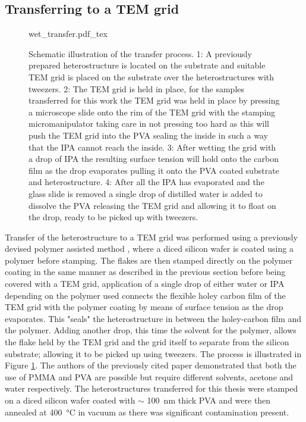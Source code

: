 \subsection{Transferring to a TEM grid}
\begin{figure}[h]
	\centering
	\def\svgwidth{1\linewidth}
	{wet_transfer.pdf_tex}
	\caption{Schematic illustration of the transfer process. 1: A previously prepared heterostructure is located on the substrate and suitable TEM grid is placed on the substrate over the heterostructures with tweezers. 2: The TEM grid is held in place, for the samples transferred for this work the TEM grid was held in place by pressing a microscope slide onto the rim of the TEM grid with the stamping micromanipulator taking care in not pressing too hard as this will push the TEM grid into the PVA sealing the inside in such a way that the IPA cannot reach the inside. 3: After wetting the grid with a drop of IPA the resulting surface tension will hold onto the carbon film as the drop evaporates pulling it onto the PVA coated substrate and heterostructure. 4: After all the IPA has evaporated and the glass slide is removed a single drop of distilled water is added to dissolve the PVA releasing the TEM grid and allowing it to float on the drop, ready to be picked up with tweezers.}
	\label{fig:wet_transfer}
\end{figure}

Transfer of the heterostructure to a TEM grid was performed using a previously devised polymer assisted method \cite{kosterPolymerassistedTEMSpecimen2021}, where a diced silicon wafer is coated using a polymer before stamping.
The flakes are then stamped directly on the polymer coating in the same manner as described in the previous section before being covered with a TEM grid, application of a single drop of either water or IPA  depending on the polymer used connects the flexible holey carbon film of the TEM grid with the polymer coating by means of surface tension as the drop evaporates. This "seals" the heterostructure in between the holey-carbon film and the polymer.
Adding another drop, this time the solvent for the polymer, allows the flake held by the TEM grid and the grid itself to separate from the silicon substrate; allowing it to be picked up using tweezers.
The process is illustrated in Figure \ref{fig:wet_transfer}.
The authors of the previously cited paper demonstrated that both the use of PMMA and PVA are possible but require different solvents, acetone and water respectively.
The heterostructures transferred for this thesis were stamped on a diced silicon wafer coated with \(\sim \) \SI{100}{\nm} thick PVA and were then annealed at \SI{400}{\degreeCelsius} in vacuum as there was significant contamination present.
